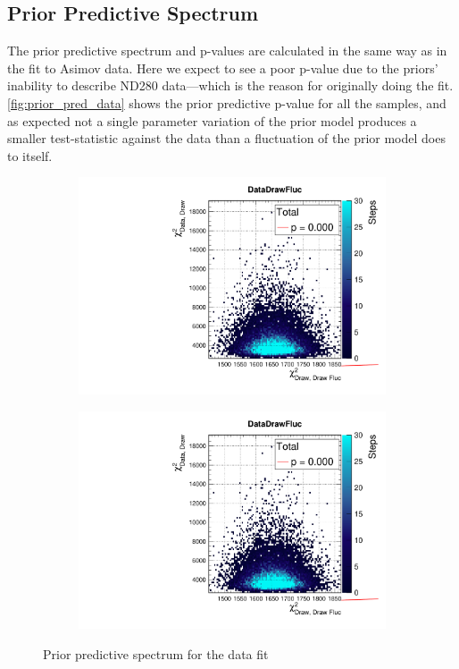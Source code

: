 \subsection{Prior Predictive Spectrum}
\label{sec:prior_pred_data}
The prior predictive spectrum and p-values are calculated in the same way as in the fit to Asimov data. Here we expect to see a poor p-value due to the priors' inability to describe ND280 data---which is the reason for originally doing the fit. \autoref{fig:prior_pred_data} shows the prior predictive p-value for all the samples, and as expected not a single parameter variation of the prior model produces a smaller test-statistic against the data than a fluctuation of the prior model does to itself.
\begin{figure}[h]
	\begin{subfigure}[t]{0.49\textwidth}
		\includegraphics[width=\textwidth, trim={0mm 0mm 0mm 11mm}, clip,page=1]{figures/mach3/data/priorpred/2017b_NewDet_3Xsec_4Det_5Flux_NewXSecTune_Data_merge_PriorPred_procs}
	\end{subfigure}
	\begin{subfigure}[t]{0.49\textwidth}
		\includegraphics[width=\textwidth, trim={0mm 0mm 0mm 11mm}, clip,page=2]{figures/mach3/data/priorpred/2017b_NewDet_3Xsec_4Det_5Flux_NewXSecTune_Data_merge_PriorPred_procs}
	\end{subfigure}
	\caption{Prior predictive spectrum for the data fit}
	\label{fig:prior_pred_data}
\end{figure}

